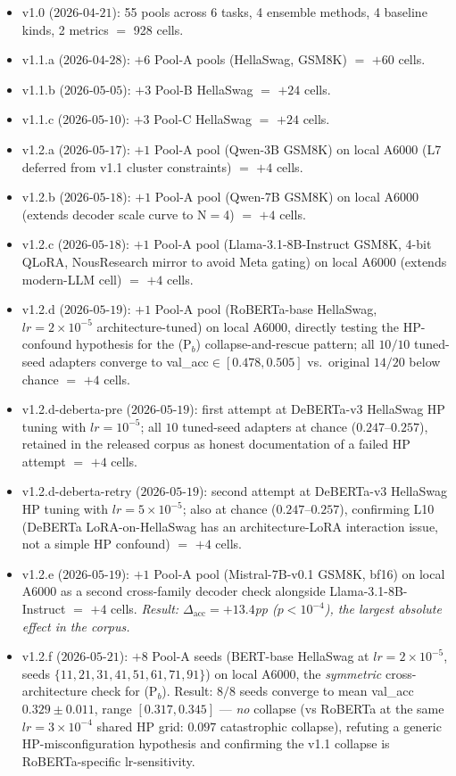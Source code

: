 \documentclass[11pt]{article}
\begin{document}
\begin{itemize}[leftmargin=*]
\item v1.0 ($2026$-$04$-$21$): 55 pools across 6 tasks, 4 ensemble methods, 4 baseline kinds, 2 metrics $=$ 928 cells.
\item v1.1.a ($2026$-$04$-$28$): $+6$ Pool-A pools (HellaSwag, GSM8K) $=$ $+60$ cells.
\item v1.1.b ($2026$-$05$-$05$): $+3$ Pool-B HellaSwag $=$ $+24$ cells.
\item v1.1.c ($2026$-$05$-$10$): $+3$ Pool-C HellaSwag $=$ $+24$ cells.
\item v1.2.a ($2026$-$05$-$17$): $+1$ Pool-A pool (Qwen-3B GSM8K) on local A6000 (L7 deferred from v1.1 cluster constraints) $=$ $+4$ cells.
\item v1.2.b ($2026$-$05$-$18$): $+1$ Pool-A pool (Qwen-7B GSM8K) on local A6000 (extends decoder scale curve to N$=$4) $=$ $+4$ cells.
\item v1.2.c ($2026$-$05$-$18$): $+1$ Pool-A pool (Llama-3.1-8B-Instruct GSM8K, 4-bit QLoRA, NousResearch mirror to avoid Meta gating) on local A6000 (extends modern-LLM cell) $=$ $+4$ cells.
\item v1.2.d ($2026$-$05$-$19$): $+1$ Pool-A pool (RoBERTa-base HellaSwag, $lr{=}2{\times}10^{-5}$ architecture-tuned) on local A6000, directly testing the HP-confound hypothesis for the (P$_b$) collapse-and-rescue pattern; all $10/10$ tuned-seed adapters converge to val\_acc${\in}[0.478, 0.505]$ vs.\ original $14/20$ below chance $=$ $+4$ cells.
\item v1.2.d-deberta-pre ($2026$-$05$-$19$): first attempt at DeBERTa-v3 HellaSwag HP tuning with $lr{=}10^{-5}$; all $10$ tuned-seed adapters at chance ($0.247$--$0.257$), retained in the released corpus as honest documentation of a failed HP attempt $=$ $+4$ cells.
\item v1.2.d-deberta-retry ($2026$-$05$-$19$): second attempt at DeBERTa-v3 HellaSwag HP tuning with $lr{=}5{\times}10^{-5}$; also at chance ($0.247$--$0.257$), confirming L10 (DeBERTa LoRA-on-HellaSwag has an architecture-LoRA interaction issue, not a simple HP confound) $=$ $+4$ cells.
\item v1.2.e ($2026$-$05$-$19$): $+1$ Pool-A pool (Mistral-7B-v0.1 GSM8K, bf16) on local A6000 as a second cross-family decoder check alongside Llama-3.1-8B-Instruct $=$ $+4$ cells. \emph{Result: $\Delta_{\text{acc}}{=}{+}13.4$pp ($p{<}10^{-4}$), the largest absolute effect in the corpus.}
\item v1.2.f ($2026$-$05$-$21$): $+8$ Pool-A seeds (BERT-base HellaSwag at $lr{=}2{\times}10^{-5}$, seeds $\{11, 21, 31, 41, 51, 61, 71, 91\}$) on local A6000, the \emph{symmetric} cross-architecture check for (P$_b$). Result: $8/8$ seeds converge to mean val\_acc $0.329 \pm 0.011$, range $[0.317, 0.345]$ — \emph{no} collapse (vs RoBERTa at the same $lr{=}3{\times}10^{-4}$ shared HP grid: $0.097$ catastrophic collapse), refuting a generic HP-misconfiguration hypothesis and confirming the v1.1 collapse is RoBERTa-specific lr-sensitivity.

\end{itemize}
\end{document}
